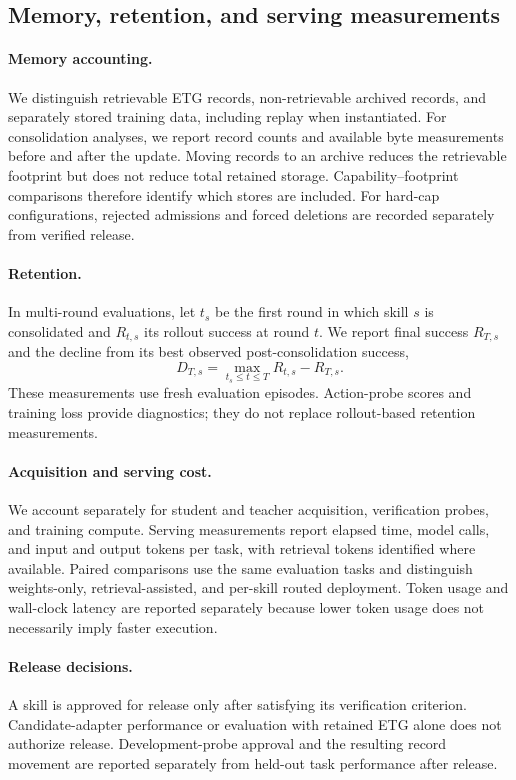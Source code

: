 \subsection{Memory, retention, and serving measurements}
\label{app:costs}

\paragraph{Memory accounting.}
We distinguish retrievable ETG records, non-retrievable
archived records, and separately stored training data,
including replay when instantiated. For consolidation
analyses, we report record counts and available byte
measurements before and after the update. Moving records
to an archive reduces the retrievable footprint but does
not reduce total retained storage. Capability--footprint
comparisons therefore identify which stores are included.
For hard-cap configurations, rejected admissions and forced
deletions are recorded separately from verified release.

\paragraph{Retention.}
In multi-round evaluations, let $t_s$ be the first round
in which skill $s$ is consolidated and $R_{t,s}$ its rollout
success at round $t$. We report final success $R_{T,s}$ and
the decline from its best observed post-consolidation success,
\begin{equation}
D_{T,s}
=\max_{t_s\leq t\leq T}R_{t,s}-R_{T,s}.
\end{equation}
These measurements use fresh evaluation episodes.
Action-probe scores and training loss provide diagnostics;
they do not replace rollout-based retention measurements.

\paragraph{Acquisition and serving cost.}
We account separately for student and teacher acquisition,
verification probes, and training compute. Serving
measurements report elapsed time, model calls, and input
and output tokens per task, with retrieval tokens identified
where available. Paired comparisons use the same evaluation
tasks and distinguish weights-only, retrieval-assisted,
and per-skill routed deployment. Token usage and wall-clock
latency are reported separately because lower token usage
does not necessarily imply faster execution.

\paragraph{Release decisions.}
A skill is approved for release only after satisfying its
verification criterion. Candidate-adapter performance or
evaluation with retained ETG alone does not authorize
release. Development-probe approval and the resulting
record movement are reported separately from held-out
task performance after release.